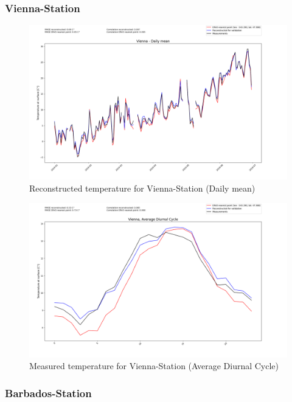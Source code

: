 \subsubsection*{Vienna-Station}

\begin{figure}
    \centering
    \includegraphics[width=1.07\textwidth]{resources/images/charts/vienna_eval_grib_final/Vienna - Daily mean.png}
    \caption{Reconstructed temperature for Vienna-Station (Daily mean)}
\end{figure}

\begin{figure}
    \centering
    \includegraphics[width=1.07\textwidth]{resources/images/charts/vienna_eval_grib_final/Vienna, Average Diurnal Cycle.png}
    \caption{Measured temperature for Vienna-Station (Average Diurnal Cycle)}
\end{figure}

\newpage

\subsubsection*{Barbados-Station}

